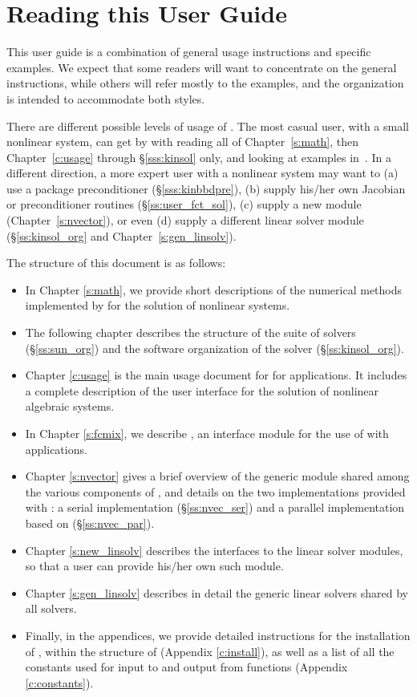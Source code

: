 \section{Reading this User Guide}\label{ss:reading}

This user guide is a combination of general usage instructions and specific
examples. We expect that some readers will want to concentrate on the general
instructions, while others will refer mostly to the examples, and the
organization is intended to accommodate both styles.

There are different possible levels of usage of {\kinsol}. The most casual
user, with a small nonlinear system, can get by with reading all of 
Chapter~\ref{s:math}, then Chapter~\ref{c:usage} through \S\ref{sss:kinsol} only, and
looking at examples in~\cite{kinsol_ex}. In a different direction, a
more expert user with a nonlinear system may want to (a) use a package
preconditioner (\S\ref{sss:kinbbdpre}), (b) supply his/her own Jacobian or
preconditioner routines (\S\ref{ss:user_fct_sol}), (c) supply a new
{\nvector} module (Chapter~\ref{s:nvector}), or even (d) supply a different
linear solver module (\S\ref{ss:kinsol_org} and Chapter~\ref{s:gen_linsolv}).

The structure of this document is as follows:
\begin{itemize}
\item
  In Chapter \ref{s:math}, we provide short descriptions of the numerical
  methods implemented by {\kinsol} for the solution of nonlinear systems.
\item
  The following chapter describes the structure of the {\sundials} suite
  of solvers (\S\ref{ss:sun_org}) and the software organization of the {\kinsol}
  solver (\S\ref{ss:kinsol_org}).
\item
  Chapter \ref{c:usage} is the main usage document for {\kinsol} for {\C} applications.
  It includes a complete description of the user interface for the solution
  of nonlinear algebraic systems.
\item
  In Chapter \ref{s:fcmix}, we describe {\fkinsol}, an interface module for the
  use of {\kinsol} with {\F} applications.
\item
  Chapter \ref{s:nvector} gives a brief overview of the generic {\nvector} module
  shared among the various components of {\sundials}, and details on the two
  {\nvector} implementations provided with {\sundials}: a serial implementation
  (\S\ref{ss:nvec_ser}) and a parallel implementation based on {\mpi} 
  (\S\ref{ss:nvec_par}).
\item
  Chapter \ref{s:new_linsolv} describes the interfaces to the linear solver
  modules, so that a user can provide his/her own such module.
\item
  Chapter \ref{s:gen_linsolv} describes in detail the generic linear solvers
  shared by all {\sundials} solvers.
\item
  Finally, in the appendices, we provide detailed instructions for the installation
  of {\kinsol}, within the structure of {\sundials} (Appendix \ref{c:install}), as well
  as a list of all the constants used for input to and output from {\kinsol} functions
  (Appendix \ref{c:constants}).
\end{itemize}

